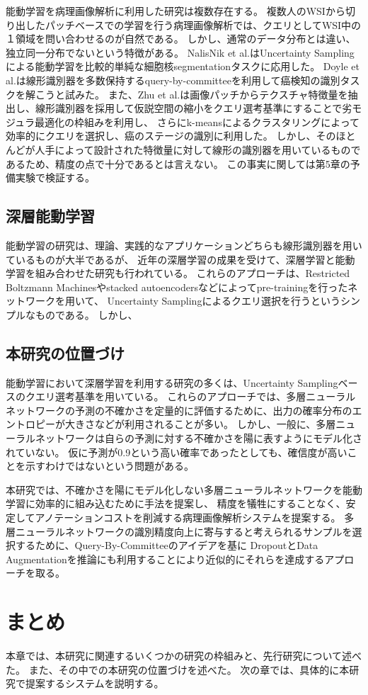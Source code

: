 能動学習を病理画像解析に利用した研究は複数存在する。
複数人のWSIから切り出したパッチベースでの学習を行う病理画像解析では、クエリとしてWSI中の１領域を問い合わせるのが自然である。
しかし、通常のデータ分布とは違い、独立同一分布でないという特徴がある。
NalisNik et al.はUncertainty Samplingによる能動学習を比較的単純な細胞核segmentationタスクに応用した\cite{nalisnik2017interactive}。
Doyle et al.は線形識別器を多数保持するquery-by-committeeを利用して癌検知の識別タスクを解こうと試みた\cite{doyle2011active}。
また、Zhu et al.は画像パッチからテクスチャ特徴量を抽出し、線形識別器を採用して仮説空間の縮小をクエリ選考基準にすることで劣モジュラ最適化の枠組みを利用し、
さらにk-meansによるクラスタリングによって効率的にクエリを選択し、癌のステージの識別に利用した\cite{zhu2014scalable}。
しかし、そのほとんどが人手によって設計された特徴量に対して線形の識別器を用いているものであるため、精度の点で十分であるとは言えない。
この事実に関しては第5章の予備実験で検証する。

\subsection{深層能動学習}
能動学習の研究は、理論、実践的なアプリケーションどちらも線形識別器を用いているものが大半であるが、
近年の深層学習の成果を受けて、深層学習と能動学習を組み合わせた研究も行われている\cite{6889457, li2016active}。
これらのアプローチは、Restricted Boltzmann Machinesやstacked autoencodersなどによってpre-trainingを行ったネットワークを用いて、
Uncertainty Samplingによるクエリ選択を行うというシンプルなものである。
しかし、

\subsection{本研究の位置づけ}
能動学習において深層学習を利用する研究の多くは、Uncertainty Samplingベースのクエリ選考基準を用いている。
これらのアプローチでは、多層ニューラルネットワークの予測の不確かさを定量的に評価するために、出力の確率分布のエントロピーが大きさなどが利用されることが多い。
しかし、一般に、多層ニューラルネットワークは自らの予測に対する不確かさを陽に表すようにモデル化されていない。
仮に予測が0.9という高い確率であったとしても、確信度が高いことを示すわけではないという問題がある。

本研究では、不確かさを陽にモデル化しない多層ニューラルネットワークを能動学習に効率的に組み込むために手法を提案し、
精度を犠牲にすることなく、安定してアノテーションコストを削減する病理画像解析システムを提案する。
多層ニューラルネットワークの識別精度向上に寄与すると考えられるサンプルを選択するために、Query-By-Committeeのアイデアを基に
DropoutとData Augmentationを推論にも利用することにより近似的にそれらを達成するアプローチを取る。

\section{まとめ}
本章では、本研究に関連するいくつかの研究の枠組みと、先行研究について述べた。
また、その中での本研究の位置づけを述べた。
次の章では、具体的に本研究で提案するシステムを説明する。